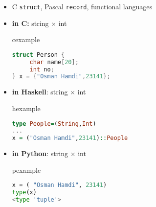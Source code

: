\begin{frame}[fragile]
\begin{itemize}
\item C {\tt struct}, Pascal {\tt record}, functional languages 
\item \textbf{in C:} string $\times$ int
\begin{beamercolorbox}{cexample}
\begin{lstlisting}[language={C}]
struct Person {
     char name[20];
     int no;
} x = {"Osman Hamdi",23141};
\end{lstlisting}\end{beamercolorbox}
\item \textbf{in Haskell}: string  $\times$ int 
\begin{beamercolorbox}{hexample}
\begin{lstlisting}[language={Haskell}]
type People=(String,Int)
...
x = ("Osman Hamdi",23141)::People
\end{lstlisting}
\end{beamercolorbox}
\item \textbf{in Python}: string $\times$ int
\begin{beamercolorbox}{pexample}
\begin{lstlisting}[language=python]
x = ( "Osman Hamdi", 23141)
type(x)
<type 'tuple'>
\end{lstlisting}
\end{beamercolorbox}
\end{itemize}
\end{frame}



